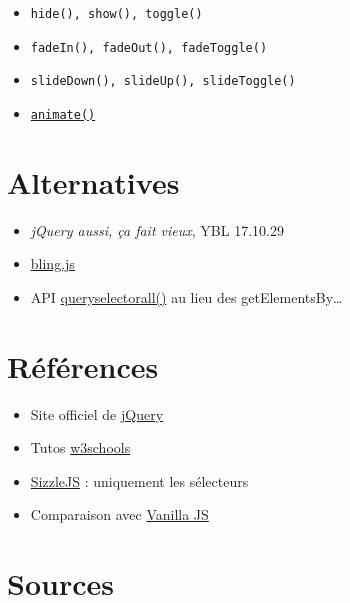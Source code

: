 \begin{itemize}
\tightlist
\item
  \textenglish{\texttt{hide(),\ show(),\ toggle()}}
\item
  \textenglish{\texttt{fadeIn(),\ fadeOut(),\ fadeToggle()}}
\item
  \textenglish{\texttt{slideDown(),\ slideUp(),\ slideToggle()}}
\item
  \href{https://www.w3schools.com/jquery/jquery_animate.asp}{\textenglish{\texttt{animate()}}}
\end{itemize}

\hypertarget{alternatives}{%
\section{Alternatives}\label{alternatives}}

\begin{itemize}
\tightlist
\item
  \emph{jQuery aussi, ça fait vieux}, YBL 17.10.29
\item
  \href{https://gist.github.com/paulirish/12fb951a8b893a454b32}{bling.js}
\item
  API
  \href{https://www.w3schools.com/jsref/met_document_queryselectorall.asp}{queryselectorall()}
  au lieu des getElementsBy\ldots{}
\end{itemize}

\hypertarget{ruxe9fuxe9rences}{%
\section{Références}\label{ruxe9fuxe9rences}}

\begin{itemize}
\tightlist
\item
  Site officiel de \href{https://jquery.com/}{jQuery}
\item
  Tutos \href{https://www.w3schools.com/jquery/}{w3schools}
\item
  \href{https://github.com/jquery/sizzle/wiki}{SizzleJS} : uniquement
  les sélecteurs
\item
  Comparaison avec \href{http://vanilla-js.com/}{Vanilla JS}
\end{itemize}

\hypertarget{sources}{%
\section{Sources}\label{sources}}
